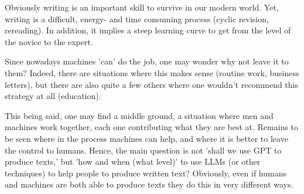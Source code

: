 {Obviously writing is an important skill to survive in our modern world. Yet, writing is a difficult, energy- and time consuming process (cyclic revision, rereading). In addition, it implies a steep learning curve to get from the level of the novice to the expert. 

Since nowadays machines 'can' do the job, one may wonder why not leave it to them? Indeed, there are situations where this makes sense (routine work, business letters), but there are also quite a few others where one wouldn't recommend this strategy at all (education). 

This being said, one may find a middle ground, a situation where men and machines work together, each one contributing what they are best at. Remains to be seen where in the process machines can help, and where it is better to leave the control to humans. Hence, the main question is not 'shall we use GPT to produce texts,' but 'how and when (what level)' to use LLMs (or other techniques) to help people to produce written text?  Obviously, even if humans and machines are both able to produce texts they do this in very different ways.} \\

 \\
\\
\\
